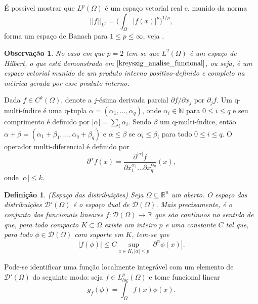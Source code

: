 \documentclass[12pt]{book}
\newtheorem{definicao}[teorema]{Definição}
\newtheorem{observacao}[teorema]{Observação}
\newcommand{\derivadaparcialabrev}[1]{\partial_{#1}}
\newcommand{\distribuicoes}{\distribuicoesgeral{\Omega}}
\newcommand{\distribuicoesgeral}[1]{\mathcal{D'}(#1)}
\newcommand{\espacoLdois}[1]{L^{2}(#1)}
\newcommand{\espacoLpcomp}[1]{L^{p}_{loc}(#1)}
\newcommand{\espacoLpGeral}[2]{L^{#1}(#2)}
\newcommand{\funcoesdiferenciaveis}[2]{C^{#1}(#2)}
\newcommand{\funcoesteste}{\funcoestestegeral{\Omega}}
\newcommand{\funcoestestegeral}[1]{\mathcal{D}(#1)}
\newcommand{\normaLp}[1]{||#1||_{L^{p}}}
\newcommand{\normaLpdefinicao}[2]{ \Big(\int_{#2}#1^{p}\Big)^{1/p}}
\newcommand{\real}[1]{\mathbb{R}^{#1}}
\newcommand{\reta}{\real{}}
\begin{document}
	
	É possível mostrar que $\espacoLpGeral{p}{\Omega}$ é um espaço vetorial real e, munido da norma
	$$
	\normaLp{f}=\normaLpdefinicao{|f(x)|}{\Omega},
	$$
	forma um espaço de Banach para $1\leq p\leq \infty$, veja \cite{breazis_sobolev_spaces}. 
	
	\begin{observacao}
		No caso em que $p=2$ tem-se que $\espacoLdois{\Omega}$ é um espaço de Hilbert, o que está demonstrado em $\cite{kreyszig_analise_funcional}$, ou seja, é um espaço vetorial munido de um produto interno positivo-definido e completo na métrica gerada por esse produto interno.
	\end{observacao}
	
	Dada $f \in \funcoesdiferenciaveis{k}{\Omega}$, denote a $j$-ésima derivada parcial $\partial f/\partial x_{j}$ por $\derivadaparcialabrev{j}f $. Um q-multi-índice é uma q-tupla $\alpha = (\alpha_{1}, \dots, \alpha_{q})$, onde $\alpha_{i} \in \mathbb{N}$ para $0\leq i \leq q$ e seu comprimento é definido por $|\alpha| = \sum_{i}\alpha_{i}$. Sendo $\beta$ um q-multi-índice, então $\alpha+\beta=(\alpha_{1}+\beta_{1}, \dots, \alpha_{q}+\beta_{q})$ e $\alpha\leq \beta$ se $\alpha_{i}\leq\beta_{i}$ para todo $0\leq i \leq q$. O operador multi-diferencial é definido por 
	$$
	\partial^{\alpha} f(x) = \frac{\partial^{|\alpha|} f}{ \partial{x^{\alpha_{1}}_{1}} \dots \partial{x^{\alpha_{q}}_{q}} }(x),
	$$
	onde $|\alpha|\leq k$.
	
	\begin{definicao}
		(Espaço das distribuições) Seja $\Omega \subseteq \real{n}$ um aberto. O espaço das distribuições $\distribuicoesgeral{\Omega}$ é o espaço dual de $\funcoesteste$. Mais precisamente, é o conjunto dos funcionais lineares $f:\funcoesteste \to \reta$ que são contínuos no sentido de que, para todo compacto $K\subset \Omega$ existe um inteiro $p$ e uma constante $C$ tal que, para todo $\phi\in \funcoesteste$ com suporte em $K$, tem-se que
		$$
		|f(\phi)| \leq C \sup\limits_{x\in K, |\alpha|\leq p}|\partial^{\alpha}\phi(x)|.
		$$
	\end{definicao}
	
	Pode-se identificar uma função localmente integrável com um elemento de $\distribuicoes$ do seguinte modo: seja $f \in \espacoLpcomp{\Omega}$ e tome funcional linear
	$$
	g_{f}(\phi)=\int_{\Omega}f(x)\phi(x).
	$$
	
\end{document}
